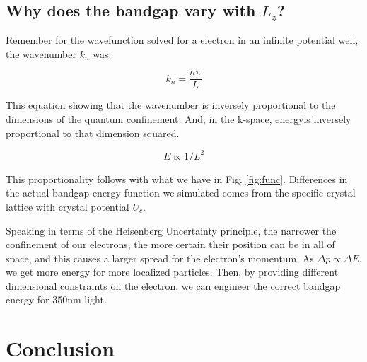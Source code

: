 \documentclass{IEEEtran}
\begin{document}
\subsection{Why does the bandgap vary with \( L_z \)?}

Remember for the wavefunction solved for a electron in an infinite potential well, the wavenumber \(k_n\) was:

\begin{equation}
    k_n = \frac{n \pi}{L}
\end{equation}

This equation showing that the wavenumber is inversely proportional to the dimensions of the quantum confinement. And, in the k-space, energyis inversely proportional to that dimension squared.

\begin{equation}
    E \propto 1/L^2
\end{equation}

This proportionality follows with what we have in Fig. \ref{fig:func}. Differences in the actual bandgap energy function we simulated comes from the specific crystal lattice with crystal potential \(U_c\).

Speaking in terms of the Heisenberg Uncertainty principle, the narrower the confinement of our electrons, the more certain their position can be in all of space, and this causes a larger spread for the electron's momentum. As \(\Delta p \propto \Delta E\), we get more energy for more localized particles. Then, by providing different dimensional constraints on the electron, we can engineer the correct bandgap energy for 350nm light.

\section{Conclusion}



\end{document}
